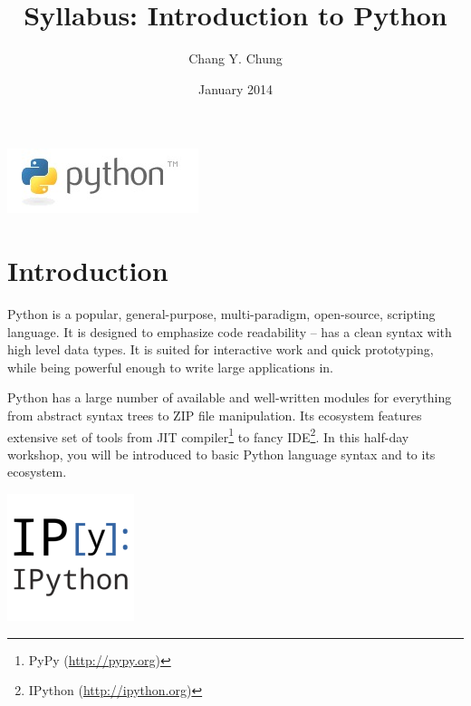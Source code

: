 \documentclass{tufte-handout}
\title{Syllabus: Introduction to Python}
\author{Chang Y. Chung}
\date{January 2014}
\begin{document}
\maketitle

\begin{marginfigure}%
  \includegraphics[width=\linewidth]{python}
  \caption{Python logo from \url{http://www.python.org}. The name is not
    after those dangerous reptiles; it is from the seventies comedy series
    ''Monte Python's Flying Circus''.}
  \label{fig:Python}
\end{marginfigure} 

\section{Introduction}\label{sec:introduction}
Python is a popular, general-purpose, multi-paradigm,
open-source, scripting language. It is designed to emphasize code
readability -- has a clean syntax with high level data types. It is
suited for interactive work and quick prototyping, while being powerful
enough to write large applications in.

Python has a large number of available and well-written modules for
everything from abstract syntax trees to ZIP file manipulation. Its
ecosystem features extensive set of tools from JIT compiler\footnote{
PyPy (\url{http://pypy.org})} to fancy IDE\footnote{IPython
(\url{http://ipython.org})}. In this half-day workshop, you will be
introduced to basic Python language syntax and to its ecosystem.

\begin{marginfigure}%
  \includegraphics[width=0.4\linewidth]{ipython}
  \caption{IPython (\url{http://ipython.org}) is a rich architecture for
    interactive computing. Version 1.0.0 was released on Aug, 2013.}
  \label{fig:IPython}
\end{marginfigure} 
\end{document}
